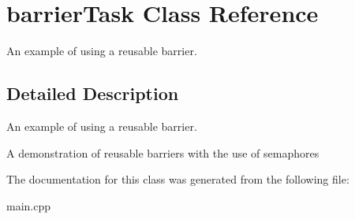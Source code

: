\hypertarget{classbarrierTask}{}\section{barrier\+Task Class Reference}
\label{classbarrierTask}


An example of using a reusable barrier.  




\subsection{Detailed Description}
An example of using a reusable barrier. 

A demonstration of reusable barriers with the use of semaphores 

The documentation for this class was generated from the following file\+:\begin{DoxyCompactItemize}
\item 
main.\+cpp\end{DoxyCompactItemize}
